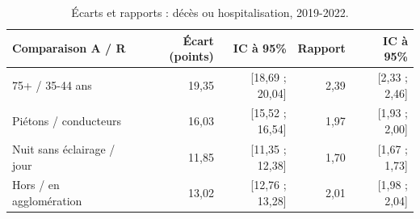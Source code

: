 \begin{table}[htbp]
\centering\small
\renewcommand{\arraystretch}{1.18}
\caption{Écarts et rapports : décès ou hospitalisation, 2019-2022.}\label{tab:deces_hospitalisation}
\begin{tabular*}{\textwidth}{@{\extracolsep{\fill}}lrrrr@{}}
\toprule
Comparaison A / R & Écart (points) & IC à 95\% & Rapport & IC à 95\% \\
\midrule
75+ / 35-44 ans & 19,35 & [18,69 ; 20,04] & 2,39 & [2,33 ; 2,46] \\
Piétons / conducteurs & 16,03 & [15,52 ; 16,54] & 1,97 & [1,93 ; 2,00] \\
Nuit sans éclairage / jour & 11,85 & [11,35 ; 12,38] & 1,70 & [1,67 ; 1,73] \\
Hors / en agglomération & 13,02 & [12,76 ; 13,28] & 2,01 & [1,98 ; 2,04] \\
\bottomrule
\end{tabular*}
\end{table}
